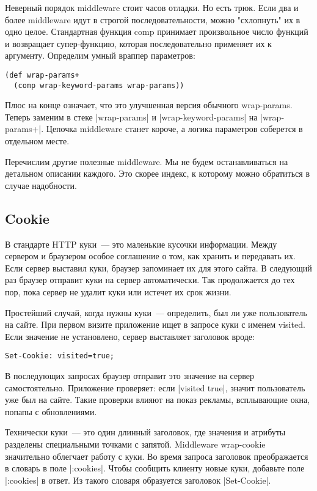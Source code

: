 Неверный порядок middleware стоит часов отладки. Но есть трюк. Если два и более
middleware идут в строгой последовательности, можно "схлопнуть" их в одно
целое. Стандартная функция comp принимает произвольное число функций и
возвращает супер-функцию, которая последовательно применяет их к
аргументу. Определим умный враппер параметров:

\begin{verbatim}
(def wrap-params+
  (comp wrap-keyword-params wrap-params))
\end{verbatim}

Плюс на конце означает, что это улучшенная версия обычного wrap-params. Теперь
заменим в стеке \spverb|wrap-params| и \spverb|wrap-keyword-params| на \spverb|wrap-params+|. Цепочка
middleware станет короче, а логика параметров соберется в отдельном месте.

Перечислим другие полезные middleware. Мы не будем останавливаться на детальном
описании каждого. Это скорее индекс, к которому можно обратиться в случае
надобности.

\subsection{Cookie}

В стандарте HTTP куки~--- это маленькие кусочки информации. Между сервером и
браузером особое соглашение о том, как хранить и передавать их. Если сервер
выставил куки, браузер запоминает их для этого сайта. В следующий раз браузер
отправит куки на сервер автоматически. Так продолжается до тех пор, пока сервер
не удалит куки или истечет их срок жизни.

Простейший случай, когда нужны куки~--- определить, был ли уже пользователь на
сайте. При первом визите приложение ищет в запросе куки с именем visited. Если
значение не установлено, сервер выставляет заголовок вроде:

\begin{verbatim}
Set-Cookie: visited=true;
\end{verbatim}

В последующих запросах браузер отправит это значение на сервер
самостоятельно. Приложение проверяет: если \spverb|visited true|, значит пользователь
уже был на сайте. Такие проверки влияют на показ рекламы, всплывающие окна,
попапы с обновлениями.

Технически куки~--- это один длинный заголовок, где значения и атрибуты разделены
специальными точками с запятой. Middleware wrap-cookie значительно облегчает
работу с куки. Во время запроса заголовок преображается в словарь в поле
\spverb|:cookies|. Чтобы сообщить клиенту новые куки, добавьте поле \spverb|:cookies| в
ответ. Из такого словаря образуется заголовок \spverb|Set-Cookie|.

